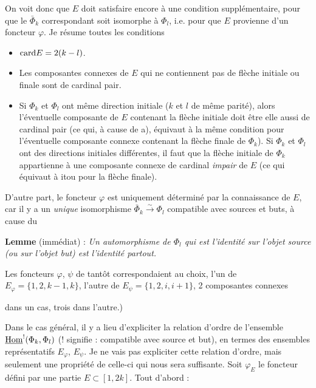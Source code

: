 On voit donc que $E$ doit satisfaire encore à une condition supplémentaire, pour que le $\bar{\Phi}_k$ correspondant soit isomorphe à $\Phi_l$, i.e. pour que $E$ provienne d'un foncteur $\varphi$. Je résume toutes les conditions

\begin{itemize}
\item[a)] $\mathrm{card} E=2(k-l)$.
\item[b)] Les composantes connexes de $E$ qui ne contiennent pas de flèche initiale ou finale sont de cardinal pair.
\item[c)] Si $\Phi_k$ et $\Phi_l$ ont même direction initiale ($k$ et $l$ de même parité), alors l'éventuelle composante de $E$ contenant la flèche initiale doit être elle aussi de cardinal pair (ce qui, à cause de a), équivaut à la même condition pour l'éventuelle composante connexe contenant la flèche finale de $\Phi_k$). Si $\Phi_k$ et $\Phi_l$ ont des directions initiales différentes, il faut que la flèche initiale de $\Phi_k$ appartienne à une composante connexe de cardinal \textit{impair} de $E$ (ce qui équivaut à itou pour la flèche finale).
\end{itemize}

D'autre part, le foncteur $\varphi$ est uniquement déterminé par la connaissance de $E$, car il y a un \textit{unique} isomorphisme $\bar{\Phi}_k\xrightarrow{\sim}\Phi_l$ compatible avec sources et buts, à cause du

\textbf{Lemme} (immédiat) : \textit{Un automorphisme de $\Phi_l$ qui est l'identité sur l'objet source (ou sur l'objet but) est l'identité partout.}

Les foncteurs $\varphi$, $\psi$ de tantôt correspondaient au choix, l'un de $E_\varphi=\{1,2,k-1,k\}$, l'autre de $E_\psi=\{1,2,i,i+1\}$, 2 composantes connexes

dans un cas, trois dans l'autre.) %



Dans le cas général, il y a lieu d'expliciter la relation d'ordre de l'ensemble $\underline{\mathrm{Hom}}^{!}(\Phi_k,\Phi_l)$ (! signifie : compatible avec source et but), en termes des ensembles représentatifs $E_\varphi$, $E_\psi$. Je ne vais pas expliciter cette relation d'ordre, mais seulement une propriété de celle-ci qui nous sera suffisante. Soit $\varphi_E$ le foncteur défini par une partie $E\subset[1,2k]$. Tout d'abord :

